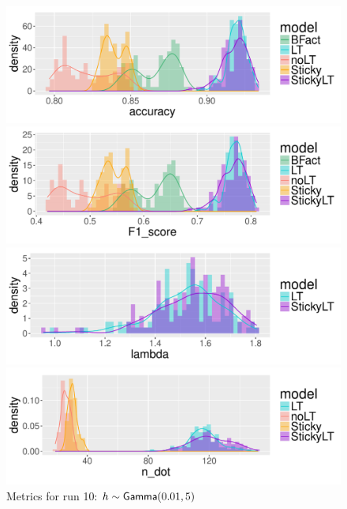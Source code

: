\begin{figure}[tb]
  \centering
  \begin{minipage}{0.75\textwidth}
  \includegraphics[width = \textwidth]{fig/cocktail/synth_s16_m12/hyper_h/h10.0_nocs_cp0/a0p01b5/accuracy_density.pdf}
\end{minipage}

\begin{minipage}{0.75\textwidth}
  \includegraphics[width = \textwidth]{fig/cocktail/synth_s16_m12/hyper_h/h10.0_nocs_cp0/a0p01b5/F1_score_density.pdf}
\end{minipage}

\begin{minipage}{0.75\textwidth}
  \includegraphics[width = \textwidth]{fig/cocktail/synth_s16_m12/hyper_h/h10.0_nocs_cp0/a0p01b5/lambda_density.pdf}
\end{minipage}

\begin{minipage}{0.75\textwidth}
  \includegraphics[width = \textwidth]{fig/cocktail/synth_s16_m12/hyper_h/h10.0_nocs_cp0/a0p01b5/n_dot_density.pdf}
\end{minipage}
\caption{Metrics for run 10: $h \sim \mathsf{Gamma}(0.01,5)$}
\end{figure}

